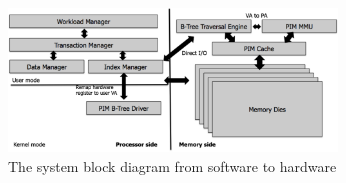 \begin{figure}[t]
  \centering
  \includegraphics[height=1.5in]{figures/pim_interface}
  \caption{The system block diagram from software to hardware}
  \label{fig:pim_interface}
\end{figure}
